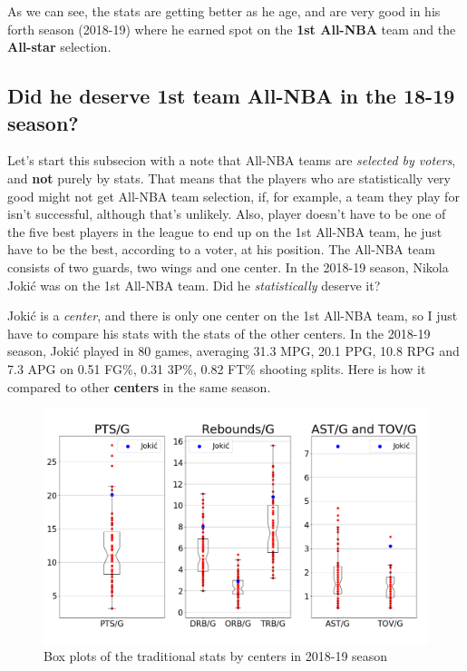 \documentclass[a4paper]{article}
\begin{document}
As we can see, the stats are getting better as he age, and are very good in his forth season (2018-19) where he earned spot on the \textbf{1st All-NBA} team and the \textbf{All-star} selection.

\subsection{Did he deserve 1st team All-NBA in the 18-19 season?}
\label{subsec:jokic_all_nba}

Let's start this subsecion with a note that All-NBA teams are \textit{selected by voters}, and \textbf{not} purely by stats. That means that the players who are statistically very good might not get All-NBA team selection, if, for example, a team they play for isn't successful, although that's unlikely. Also, player doesn't have to be one of the five best players in the league to end up on the 1st All-NBA team, he just have to be the best, according to a voter, at his position. The All-NBA team consists of two guards, two wings and one center. In the 2018-19 season, Nikola Joki\' c was on the 1st All-NBA team. Did he \textit{statistically} deserve it?

Joki\' c is a \textit{center}, and there is only one center on the 1st All-NBA team, so I just have to compare his stats with the stats of the other centers. In the 2018-19 season, Joki\' c played in 80 games, averaging 31.3 MPG, 20.1 PPG, 10.8 RPG and 7.3 APG on 0.51 FG\%, 0.31 3P\%, 0.82 FT\% shooting splits. Here is how it compared to other \textbf{centers} in the same season.


\begin{figure}[h!]
\begin{center}
\includegraphics[scale=0.30]{centers_traditional.png}
\end{center}
\caption{Box plots of the traditional stats by centers in 2018-19 season}
\label{plt:centers_trad}
\end{figure}
\end{document}
